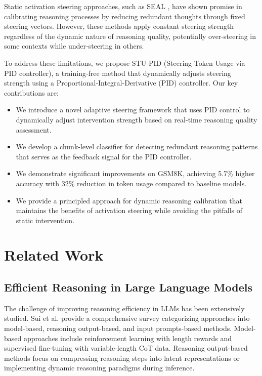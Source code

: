 \documentclass{article}
\begin{document}
Static activation steering approaches, such as SEAL \cite{chen2025seal}, have shown promise in calibrating reasoning processes by reducing redundant thoughts through fixed steering vectors. However, these methods apply constant steering strength regardless of the dynamic nature of reasoning quality, potentially over-steering in some contexts while under-steering in others.

To address these limitations, we propose STU-PID (Steering Token Usage via PID controller), a training-free method that dynamically adjusts steering strength using a Proportional-Integral-Derivative (PID) controller. Our key contributions are:

\begin{itemize}
\item We introduce a novel adaptive steering framework that uses PID control to dynamically adjust intervention strength based on real-time reasoning quality assessment.
\item We develop a chunk-level classifier for detecting redundant reasoning patterns that serves as the feedback signal for the PID controller.
\item We demonstrate significant improvements on GSM8K, achieving 5.7\% higher accuracy with 32\% reduction in token usage compared to baseline models.
\item We provide a principled approach for dynamic reasoning calibration that maintains the benefits of activation steering while avoiding the pitfalls of static intervention.
\end{itemize}

\section{Related Work}

\subsection{Efficient Reasoning in Large Language Models}

The challenge of improving reasoning efficiency in LLMs has been extensively studied. Sui et al. \cite{sui2025stop} provide a comprehensive survey categorizing approaches into model-based, reasoning output-based, and input prompts-based methods. Model-based approaches include reinforcement learning with length rewards and supervised fine-tuning with variable-length CoT data. Reasoning output-based methods focus on compressing reasoning steps into latent representations or implementing dynamic reasoning paradigms during inference.
\end{document}
